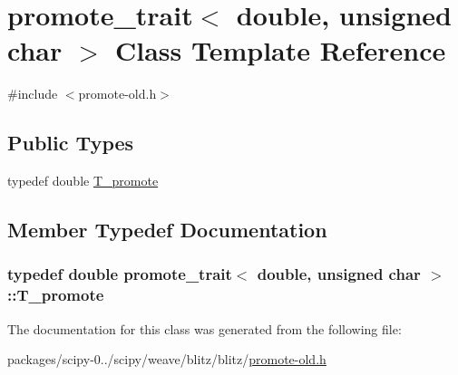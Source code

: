 \hypertarget{classpromote__trait_3_01double_00_01unsigned_01char_01_4}{}\section{promote\+\_\+trait$<$ double, unsigned char $>$ Class Template Reference}
\label{classpromote__trait_3_01double_00_01unsigned_01char_01_4}


{\ttfamily \#include $<$promote-\/old.\+h$>$}

\subsection*{Public Types}
\begin{DoxyCompactItemize}
\item 
typedef double \hyperlink{classpromote__trait_3_01double_00_01unsigned_01char_01_4_aeec6726f27b77f2e1de6132da06e9c6a}{T\+\_\+promote}
\end{DoxyCompactItemize}


\subsection{Member Typedef Documentation}
\hypertarget{classpromote__trait_3_01double_00_01unsigned_01char_01_4_aeec6726f27b77f2e1de6132da06e9c6a}{}
\subsubsection[{T\+\_\+promote}]{\setlength{\rightskip}{0pt plus 5cm}typedef double {\bf promote\+\_\+trait}$<$ double, unsigned char $>$\+::{\bf T\+\_\+promote}}\label{classpromote__trait_3_01double_00_01unsigned_01char_01_4_aeec6726f27b77f2e1de6132da06e9c6a}


The documentation for this class was generated from the following file\+:\begin{DoxyCompactItemize}
\item 
packages/scipy-\/0../scipy/weave/blitz/blitz/\hyperlink{promote-old_8h}{promote-\/old.\+h}\end{DoxyCompactItemize}
